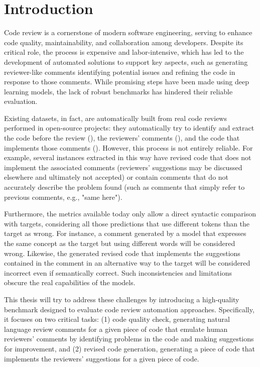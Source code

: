 \section{Introduction}
Code review is a cornerstone of modern software engineering, serving to enhance
code quality, maintainability, and collaboration among developers. Despite its critical
role, the process is expensive and labor-intensive, which has led to the development 
of automated solutions to support key aspects, such as generating reviewer-like 
comments identifying potential issues and refining the code in response to those comments. 
While promising steps have been made using deep learning models, the lack of robust 
benchmarks has hindered their reliable evaluation.

Existing datasets, in fact, are automatically built from real code reviews
performed in open-source projects: they automatically try to identify and
extract the code before the review (\subCode), the reviewers' comments
(\revComment), and the code that implements those comments (\revCode). However,
this process is not entirely reliable. For example, several instances extracted
in this way have revised code that does not implement the associated comments
(reviewers' suggestions may be discussed elsewhere and ultimately not accepted)
or contain comments that do not accurately describe the problem found (such as
comments that simply refer to previous comments, e.g., "same here").

Furthermore, the metrics available today only allow a direct syntactic comparison with targets, 
considering all those predictions that use different tokens than the target as wrong. For instance, 
a comment generated by a model that expresses the same concept as the target but using 
different words will be considered wrong. Likewise, the generated revised code that implements 
the suggestions contained in the comment in an alternative way to the target will be considered 
incorrect even if semantically correct.
Such inconsistencies and limitations obscure the real capabilities of the models.


This thesis will try to address these challenges by introducing a high-quality
benchmark designed to evaluate code review automation approaches.
Specifically, it focuses on two critical tasks: (1) code quality check, \ie
generating natural language review comments for a given piece of code that emulate 
human reviewers' comments by identifying problems in the code and making suggestions 
for improvement, and (2) revised code generation, \ie generating a piece of code that 
implements the reviewers' suggestions for a given piece of code.

